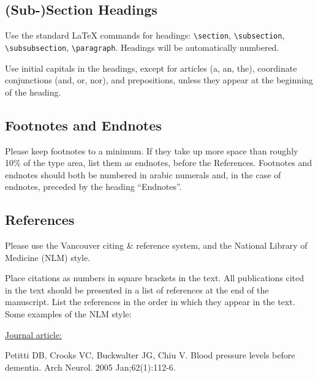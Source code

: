 \documentclass{IOS-Book-Article}
\begin{document}
\subsection{(Sub-)Section Headings}
Use the standard \LaTeX{} commands for headings: {\small \verb|\section|, \verb|\subsection|, \verb|\subsubsection|, \verb|\paragraph|}.
Headings will be automatically numbered.

Use initial capitals in the headings, except for articles (a, an, the), coordinate
conjunctions (and, or, nor), and prepositions, unless they appear at the beginning
of the heading.

\subsection{Footnotes and Endnotes}
Please keep footnotes to a minimum. If they take up more space than roughly 10\% of
the type area, list them as endnotes, before the References. Footnotes and endnotes
should both be numbered in arabic numerals and, in the case of endnotes, preceded by
the heading ``Endnotes''.

\subsection{References}

Please use the Vancouver citing \& reference system, and the National Library of
Medicine (NLM) style.

Place citations as numbers in square brackets in the text. All publications cited in
the text should be presented in a list of references at the end of the manuscript.
List the references in the order in which they appear in the text. Some examples of
the NLM style:

\medskip
\noindent\ul{Journal article:}\par\noindent
Petitti DB, Crooks VC, Buckwalter JG, Chiu V. Blood pressure levels before dementia.
Arch Neurol. 2005 Jan;62(1):112-6.
\end{document}
